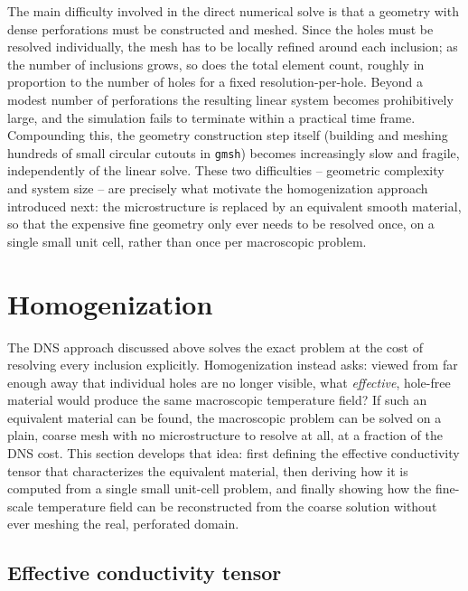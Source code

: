 \documentclass{article}
\makeatletter
\providecommand\FloatBarrier{\par\begingroup\let\@elt\relax
  \edef\@tempa{\@botlist\@deferlist\@dbldeferlist}%
  \ifx\@tempa\@empty\else\clearpage\fi\endgroup}
\makeatother
\begin{document}
The main difficulty involved in the direct numerical solve is that a geometry
with dense perforations must be constructed and meshed. Since the holes must
be resolved individually, the mesh has to be locally refined around each
inclusion; as the number of inclusions grows, so does the total element
count, roughly in proportion to the number of holes for a fixed
resolution-per-hole. Beyond a modest number of perforations the resulting
linear system becomes prohibitively large, and the simulation fails to
terminate within a practical time frame. Compounding this, the geometry
construction step itself (building and meshing hundreds of small circular
cutouts in \texttt{gmsh}) becomes increasingly slow and fragile, independently
of the linear solve. These two difficulties -- geometric complexity and
system size -- are precisely what motivate the homogenization approach
introduced next: the microstructure is replaced by an equivalent smooth
material, so that the expensive fine geometry only ever needs to be resolved
once, on a single small unit cell, rather than once per macroscopic problem.

\FloatBarrier
\section{Homogenization }

The DNS approach discussed above solves the exact problem at the cost of
resolving every inclusion explicitly. Homogenization instead asks: viewed
from far enough away that individual holes are no longer visible, what
\emph{effective}, hole-free material would produce the same macroscopic
temperature field? If such an equivalent material can be found, the
macroscopic problem can be solved on a plain, coarse mesh with no
microstructure to resolve at all, at a fraction of the DNS cost. This section
develops that idea: first defining the effective conductivity tensor that
characterizes the equivalent material, then deriving how it is computed from
a single small unit-cell problem, and finally showing how the fine-scale
temperature field can be reconstructed from the coarse solution without ever
meshing the real, perforated domain.

\FloatBarrier
\subsection{Effective conductivity tensor }
\label{sec:effective}
\end{document}
